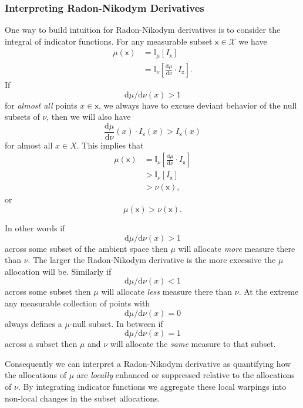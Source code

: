\documentclass[
  letterpaper,
  DIV=11,
  numbers=noendperiod]{scrartcl}
\begin{document}
\hypertarget{interpreting-radon-nikodym-derivatives}{%
\subsubsection{Interpreting Radon-Nikodym
Derivatives}\label{interpreting-radon-nikodym-derivatives}}

One way to build intuition for Radon-Nikodym derivatives is to consider
the integral of indicator functions. For any measurable subset
\(\mathsf{x} \in \mathcal{X}\) we have \begin{align*}
\mu( \mathsf{x} )
&=
\mathbb{I}_{\mu} [ I_{\mathsf{x}} ]
\\
&=
\mathbb{I}_{\nu} \left[
\frac{ \mathrm{d} \mu }{ \mathrm{d} \nu } \cdot I_{\mathsf{x}} \right].
\end{align*} If \[
\mathrm{d} \mu / \mathrm{d} \nu(x) > 1
\] for \emph{almost all} points \(x \in \mathsf{x}\), we always have to
excuse deviant behavior of the null subsets of \(\nu\), then we will
also have \[
\frac{ \mathrm{d} \mu }{ \mathrm{d} \nu }(x) \cdot I_{\mathsf{x}}(x)
> I_{\mathsf{x}}(x)
\] for almost all \(x \in X\). This implies that \begin{align*}
\mu( \mathsf{x} )
&=
\mathbb{I}_{\nu} \left[
\frac{ \mathrm{d} \mu }{ \mathrm{d} \nu } \cdot I_{\mathsf{x}} \right]
\\
&>
\mathbb{I}_{\nu} \left[ I_{\mathsf{x}} \right]
\\
&>
\nu(\mathsf{x}),
\end{align*} or \[
\mu( \mathsf{x} ) > \nu( \mathsf{x} ).
\]

In other words if \[
\mathrm{d} \mu / \mathrm{d} \nu(x) > 1
\] across some subset of the ambient space then \(\mu\) will allocate
\emph{more} measure there than \(\nu\). The larger the Radon-Nikodym
derivative is the more excessive the \(\mu\) allocation will be.
Similarly if \[
\mathrm{d} \mu / \mathrm{d} \nu(x) < 1
\] across some subset then \(\mu\) will allocate \emph{less} measure
there than \(\nu\). At the extreme any measurable collection of points
with \[
\mathrm{d} \mu / \mathrm{d} \nu(x) = 0
\] always defines a \(\mu\)-null subset. In between if \[
\mathrm{d} \mu / \mathrm{d} \nu(x) = 1
\] across a subset then \(\mu\) and \(\nu\) will allocate the
\emph{same} measure to that subset.

Consequently we can interpret a Radon-Nikodym derivative as quantifying
how the allocations of \(\mu\) are \emph{locally} enhanced or suppressed
relative to the allocations of \(\nu\). By integrating indicator
functions we aggregate these local warpings into non-local changes in
the subset allocations.
\end{document}
